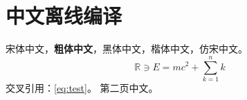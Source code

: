 \documentclass{ctexart}
\begin{document}
\section{中文离线编译}
宋体中文，\textbf{粗体中文}，{\heiti 黑体中文}，{\kaishu 楷体中文}，{\fangsong 仿宋中文}。
\begin{equation}\label{eq:test}\mathbb{R}\ni E=mc^2+\sum_{k=1}^{n}k\end{equation}
交叉引用：\cref{eq:test}。
\newpage 第二页中文。
\end{document}
